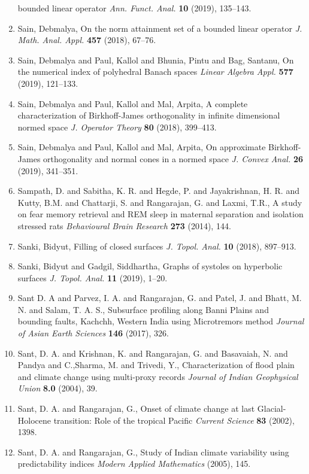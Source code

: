 \begin{enumerate}
bounded linear operator {\em Ann. Funct. Anal.} {\bf 10} (2019), 135--143.
\item Sain, Debmalya, On the norm attainment set of a bounded linear operator {\em J. Math. Anal. Appl.} {\bf 457} (2018), 67--76.
\item Sain, Debmalya and Paul, Kallol and Bhunia, Pintu and Bag,
Santanu, On the numerical index of polyhedral {B}anach spaces {\em Linear Algebra Appl.} {\bf 577} (2019), 121--133.
\item Sain, Debmalya and Paul, Kallol and Mal, Arpita, A complete characterization of {B}irkhoff-{J}ames
orthogonality in infinite dimensional normed space {\em J. Operator Theory} {\bf 80} (2018), 399--413.
\item Sain, Debmalya and Paul, Kallol and Mal, Arpita, On approximate {B}irkhoff-{J}ames orthogonality and normal
cones in a normed space {\em J. Convex Anal.} {\bf 26} (2019), 341--351.
\item Sampath, D. and Sabitha, K. R. and Hegde, P. and Jayakrishnan, H. R. and Kutty, B.M. and Chattarji, S. and Rangarajan, G. and Laxmi, T.R., A study on fear memory retrieval and REM sleep in maternal separation and isolation stressed rats {\em Behavioural Brain Research} {\bf 273} (2014), 144.
\item Sanki, Bidyut, Filling of closed surfaces {\em J. Topol. Anal.} {\bf 10} (2018), 897--913.
\item Sanki, Bidyut and Gadgil, Siddhartha, Graphs of systoles on hyperbolic surfaces {\em J. Topol. Anal.} {\bf 11} (2019), 1--20.
\item Sant D. A and Parvez, I. A. and Rangarajan, G. and Patel, J. and Bhatt, M. N. and Salam, T. A. S., Subsurface profiling along Banni Plains and bounding faults, Kachchh, Western India using Microtremors method {\em Journal of Asian Earth Sciences} {\bf 146} (2017), 326.
\item Sant, D. A. and Krishnan, K. and Rangarajan, G. and Basavaiah, N. and Pandya and C.,Sharma, M. and Trivedi, Y., Characterization of flood plain and climate change using multi-proxy records {\em Journal of Indian Geophysical Union} {\bf 8.0} (2004), 39.
\item Sant, D. A. and Rangarajan, G., Onset of climate change at last Glacial-Holocene transition: Role of the tropical Pacific {\em Current Science} {\bf 83} (2002), 1398.
\item Sant, D. A. and Rangarajan, G., Study of Indian climate variability using predictability indices {\em Modern Applied Mathematics} {\bf } (2005), 145.

\end{enumerate}
